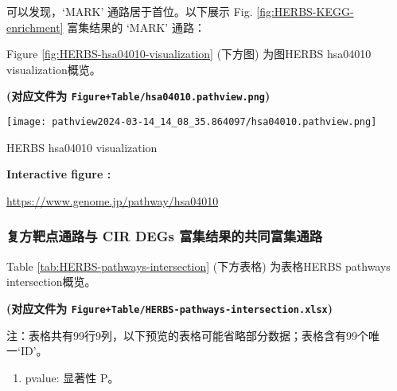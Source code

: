 \documentclass[
]{article}
\providecommand{\tightlist}{%
  \setlength{\itemsep}{0pt}\setlength{\parskip}{0pt}}
\begin{document}
可以发现，`MARK' 通路居于首位。以下展示 Fig. \ref{fig:HERBS-KEGG-enrichment} 富集结果的 `MARK' 通路：

Figure \ref{fig:HERBS-hsa04010-visualization} (下方图) 为图HERBS hsa04010 visualization概览。

\textbf{(对应文件为 \texttt{Figure+Table/hsa04010.pathview.png})}

\def\@captype{figure}
\begin{center}
\texttt{[image: pathview2024-03-14\_14\_08\_35.864097/hsa04010.pathview.png]}
\caption{HERBS hsa04010 visualization}\label{fig:HERBS-hsa04010-visualization}
\end{center}
\begin{center}\begin{tcolorbox}[colback=gray!10, colframe=gray!50, width=0.9\linewidth, arc=1mm, boxrule=0.5pt]
\textbf{
Interactive figure
:}

\vspace{0.5em}

    \url{https://www.genome.jp/pathway/hsa04010}

\vspace{2em}
\end{tcolorbox}
\end{center}

\hypertarget{ux590dux65b9ux9776ux70b9ux901aux8defux4e0e-cir-degs-ux5bccux96c6ux7ed3ux679cux7684ux5171ux540cux5bccux96c6ux901aux8def}{%
\subsubsection{复方靶点通路与 CIR DEGs 富集结果的共同富集通路}\label{ux590dux65b9ux9776ux70b9ux901aux8defux4e0e-cir-degs-ux5bccux96c6ux7ed3ux679cux7684ux5171ux540cux5bccux96c6ux901aux8def}}

Table \ref{tab:HERBS-pathways-intersection} (下方表格) 为表格HERBS pathways intersection概览。

\textbf{(对应文件为 \texttt{Figure+Table/HERBS-pathways-intersection.xlsx})}

\begin{center}\begin{tcolorbox}[colback=gray!10, colframe=gray!50, width=0.9\linewidth, arc=1mm, boxrule=0.5pt]注：表格共有99行9列，以下预览的表格可能省略部分数据；表格含有99个唯一`ID'。
\end{tcolorbox}
\end{center}
\begin{center}\begin{tcolorbox}[colback=gray!10, colframe=gray!50, width=0.9\linewidth, arc=1mm, boxrule=0.5pt]\begin{enumerate}\tightlist
\item pvalue:  显著性 P。
\end{enumerate}\end{tcolorbox}
\end{center}
\end{document}
